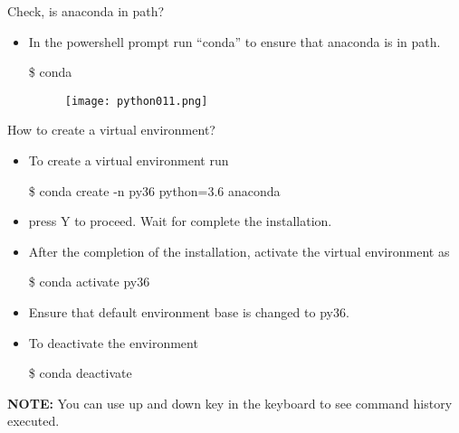 \begin{frame}{Check, is anaconda in path?}
\begin{itemize}
\item In the powershell prompt {\color{red}run ``conda''} to ensure that anaconda is in path.

\begin{center}
{\color{blue}\$ conda}
\end{center}
\begin{figure}
\texttt{[image: python011.png]}
\end{figure}
\end{itemize}
\end{frame}

\begin{frame}{How to create a virtual environment?}
\begin{itemize}
\item To create a virtual environment run

\begin{center}
{\color{blue}\$ conda create -n py36 python=3.6 anaconda}
\end{center}

\item press {\color{red}Y} to proceed. Wait for complete the installation.

\item After the completion of the installation, activate the virtual environment as
 
\begin{center}
{\color{blue}\$ conda activate py36}
\end{center} 
      
\item Ensure that default environment base is changed to py36.

\item To deactivate the environment

\begin{center}
{\color{blue}\$ conda deactivate}
\end{center} 
\end{itemize}
\textbf{\color{red}NOTE: }  You can use up and down key in the keyboard to see command history executed.
\end{frame}

